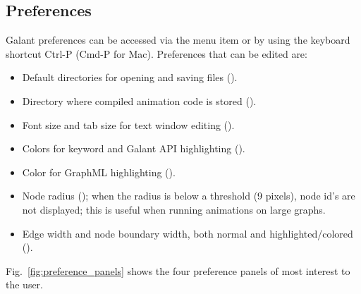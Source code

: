 \subsection{Preferences}
\label{sec:preferences}

Galant preferences can be accessed via the 
menu item or by using the keyboard shortcut \textsf{Ctrl-P}
(\textsf{Cmd-P} for Mac).
Preferences that can be edited are:
\begin{itemize}
\item
Default directories for opening and saving files ().
\item
Directory where compiled animation code is stored ().
\item
Font size and tab size for text window editing ().
\item
Colors for keyword and Galant API highlighting ().
\item
Color for GraphML highlighting ().
\item
Node radius ();
when the radius is below a threshold (9 pixels), node id's are not displayed;
this is useful when running animations on large graphs.
\item
  Edge width and node boundary width, both normal and highlighted/colored
  ().
\end{itemize}



Fig.~\ref{fig:preference_panels} shows the four preference panels of most
interest to the user.

